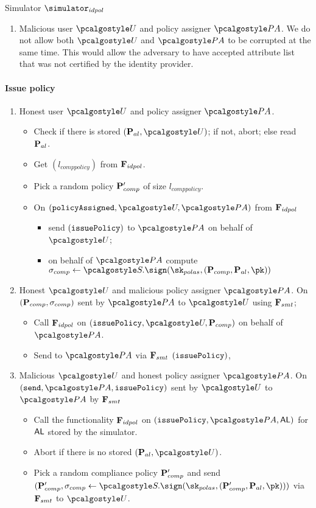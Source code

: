 \documentclass[runningheads,10pt]{llncs}
\numberwithin{equation}{section}
\begin{document}
\begin{simbox}{Simulator $\simulator_{idpol}$}
\begin{enumerate}
  \item Malicious user $\user$ and policy assigner $\polas$. We do not allow both $\user$
    and $\polas$ to be corrupted at the same time. This would allow the adversary to have
    accepted attribute list that was not certified by the identity provider.
  \end{enumerate}

  \paragraph{Issue policy}
  \begin{enumerate}
  \item Honest user $\user$ and policy assigner $\polas$.
    \begin{itemize}
    \item Check if there is stored $(\alpolicy, \user)$; if not, abort; else read
      $\mathbf{P}_{al}$.
    \item Get $(l_{comppolicy})$ from $\mathbf{F}_{{idpol}}$.
    \item Pick a random policy $\mathbf{P}_{comp}'$ of size $l_{comppolicy}$.
    \item On $(\policyAssigned, \user, \polas)$ from $\mathbf{F}_{{idpol}}$
      \begin{itemize}
      \item send $(\mathtt{issuePolicy})$ to $\polas$ on behalf of $\user$;
      \item on behalf of $\polas$ compute
        $\signature_{comp} \gets \SIG.\sign(\sk_{polas}, (\comppolicy, \alpolicy,
        \pk))$
      \end{itemize}
    \end{itemize}

  \item Honest $\user$ and malicious policy assigner $\polas$.  On
    $(\mathbf{P}_{comp}, \sigma_{comp})$ sent by $\polas$ to $\user$ using $\mathbf{F}_{{smt}}$;
    \begin{itemize}
    \item Call $\mathbf{F}_{{idpol}}$ on $(\issuePolicy, \user, \comppolicy)$ on behalf of
      $\polas$.
    \item Send to $\polas$ via $\mathbf{F}_{{smt}}$ $(\mathtt{issuePolicy})$,
    \end{itemize}

  \item Malicious $\user$ and honest policy assigner $\polas$.  On
    $(\send, \polas, \issuePolicy)$ sent by $\user$ to $\polas$ by $\mathbf{F}_{{smt}}$
    \begin{itemize}
    \item Call the functionality $\mathbf{F}_{{idpol}}$ on $(\issuePolicy, \polas, \AL)$ for
      $\mathsf{AL}$ stored by the simulator.
    \item Abort if there is no stored $(\alpolicy, \user)$.
    \item Pick a random compliance policy $\mathbf{P}_{comp}'$ and send
      $(\comppolicy', \signature_{comp} \gets \SIG.\sign(\sk_{polas}, (\comppolicy',
      \alpolicy, \pk)))$ via $\mathbf{F}_{{smt}}$ to $\user$.
    \end{itemize}


\end{enumerate}
\end{simbox}
\end{document}
